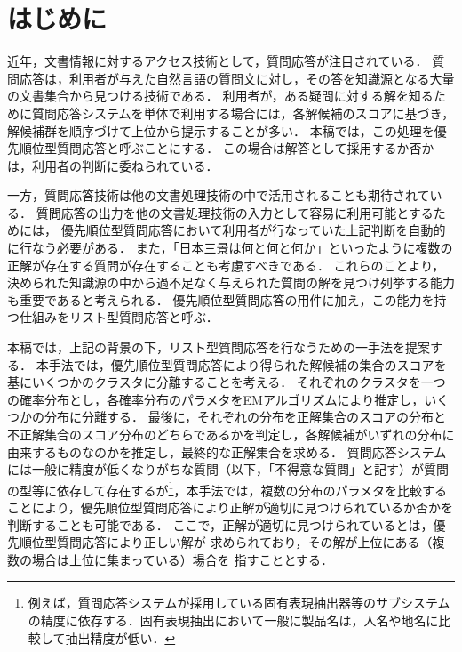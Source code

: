 \documentclass[japanese]{jnlp_1.4}
\begin{document}
\maketitle



\section{はじめに}\label{Chapter:introduction}


近年，文書情報に対するアクセス技術として，質問応答が注目されている．
質問応答は，利用者が与えた自然言語の質問文に対し，その答を知識源となる大量の文書集合から見つける技術である．
利用者が，ある疑問に対する解を知るために質問応答システムを単体で利用する場合には，各解候補のスコアに基づき，解候補群を順序づけて上位から提示することが多い．
本稿では，この処理を優先順位型質問応答と呼ぶことにする．
この場合は解答として採用するか否かは，利用者の判断に委ねられている．

一方，質問応答技術は他の文書処理技術の中で活用されることも期待されている．
質問応答の出力を他の文書処理技術の入力として容易に利用可能とするためには，
優先順位型質問応答において利用者が行なっていた上記判断を自動的に行なう必要がある．
また，「日本三景は何と何と何か」といったように複数の正解が存在する質問が存在することも考慮すべきである．
これらのことより，決められた知識源の中から過不足なく与えられた質問の解を見つけ列挙する能力も重要であると考えられる．
優先順位型質問応答の用件に加え，この能力を持つ仕組みをリスト型質問応答と呼ぶ\cite{Fukumoto:QAC1}\cite{加藤:リスト型質問応答の特徴付けと評価指標}．

本稿では，上記の背景の下，リスト型質問応答を行なうための一手法を提案する．
本手法では，優先順位型質問応答により得られた解候補の集合のスコアを基にいくつかのクラスタに分離することを考える．
それぞれのクラスタを一つの確率分布とし，各確率分布のパラメタをEMアルゴリズムにより推定し，いくつかの分布に分離する．
最後に，それぞれの分布を正解集合のスコアの分布と不正解集合のスコア分布のどちらであるかを判定し，各解候補がいずれの分布に由来するものなのかを推定し，最終的な正解集合を求める．
質問応答システムには一般に精度が低くなりがちな質問（以下，「不得意な質問」と記す）が質問の型等に依存して存在するが\footnote{例えば，質問応答システムが採用している固有表現抽出器等のサブシステムの精度に依存する．固有表現抽出において一般に製品名は，人名や地名に比較して抽出精度が低い．}，本手法では，複数の分布のパラメタを比較することにより，優先順位型質問応答により正解が適切に見つけられているか否かを判断することも可能である．
ここで，正解が適切に見つけられているとは，優先順位型質問応答により正しい解が
求められており，その解が上位にある（複数の場合は上位に集まっている）場合を
指すこととする．
\end{document}
